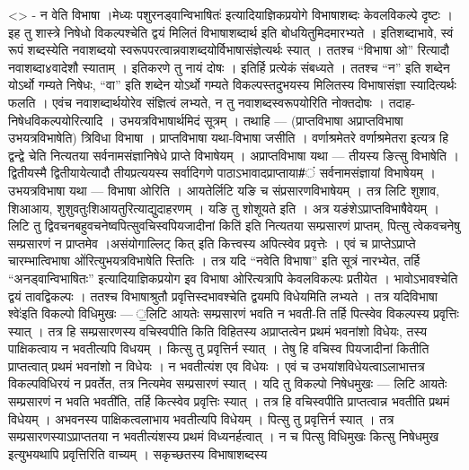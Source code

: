 \textless{}\textgreater{} - न वेति विभाषा ।मेध्यः पशुरनड्वान्विभाषितः॑
इत्यादियाज्ञिकप्रयोगे विभाषाशब्दः केवलविकल्पे दृष्टः । इह तु शास्त्रे
निषेधो विकल्पश्चेति द्वयं मिलितं विभाषाशब्दार्थ इति बोधयितुमिदमारभ्यते ।
इतिशब्दाभावे, स्वं रूपं शब्दस्येति नवाशब्दयो
स्वरूपपरत्वान्नवाशब्दयोर्विभाषासंज्ञेत्यर्थः स्यात् । ततश्च ``विभाषा ओ''
रित्यादौ नवाशब्दा४वादेशौ स्याताम् । इतिकरणे तु नायं दोषः । इतिर्हि
प्रत्येकं संबध्यते । ततश्च ``न'' इति शब्देन योऽर्थो गम्यते निषेधः,
``वा'' इति शब्देन योऽर्थो गम्यते विकल्पस्तदुभयस्य मिलितस्य विभाषासंज्ञा
स्यादित्यर्थः फलति । एवंच नवाशब्दार्थयोरेव संज्ञित्वं लभ्यते, न तु
नवाशब्दस्वरूपयोरिति नोक्तदोषः । तदाह-निषेधविकल्पयोरित्यादि ।
उभयत्रविभाषार्थमिदं सूत्रम् । तथाहि --- (प्राप्तविभाषा अप्राप्तविभाषा
उभयत्रविभाषेति) त्रिविधा विभाषा । प्राप्तविभाषा यथा-विभाषा जसीति ।
वर्णाश्रमेतरे वर्णाश्रमेतरा इत्यत्र हि द्वन्द्वे चेति नित्यतया
सर्वनामसंज्ञानिषेधे प्राप्ते विभाषेयम् । अप्राप्तविभाषा यथा --- तीयस्य
ङित्सु विभाषेति । द्वितीयस्मै द्वितीयायेत्यादौ तीयप्रत्ययस्य सर्वादिगणे
पाठाऽभावादप्राप्ताया\#ं सर्वनामसंज्ञायां विभाषेयम् । उभयत्रविभाषा यथा
--- विभाषा ओरिति । आयतेर्लिटि यङि च संप्रसारणविभाषेयम् । तत्र लिटि
शुशाव, शिआआय, शुशुवतुःशिआयतुरित्याद्युदाहरणम् । यङि तु शोशूयते इति ।
अत्र यङंशेऽप्राप्तविभाषैवेयम् । लिटि तु
द्विवचनबहुवचनेष्वपित्सुवचिस्वपियजादीनां किति॑ इति नित्यतया सम्प्रसारणं
प्राप्तम्, पित्सु त्वेकवचनेषु सम्प्रसारणं न प्राप्तमेव ।असंयोगाल्लिट्
कित् इति कित्त्वस्य अपित्स्वेव प्रवृत्तेः । एवं च प्राप्तेऽप्राप्ते
चारम्भात्विभाषा ओ॑रित्युभयत्रविभाषेति स्तितिः । तत्र यदि ``नवेति
विभाषा'' इति सूत्रं नारभ्येत, तर्हि ``अनड्वान्विभाषितः''
इत्यादियाज्ञिकप्रयोग इव विभाषा ओरित्यत्रापि केवलविकल्पः प्रतीयेत ।
भावोऽभावश्चेति द्वयं तावद्विकल्पः । ततश्च विभाषाश्रुतौ
प्रवृत्तिस्दभावश्चेति द्वयमपि विधेयमिति लभ्यते । तत्र यदिविभाषा
श्वेः॑इति विकल्पो विधिमुखः --- ॒लिटि आयतेः सम्प्रसारणं भवति न भवती-ति
तर्हि पित्स्वेव विकल्पस्य प्रवृत्तिः स्यात् । तत्र हि सम्प्रसारणस्य
वचिस्वपीति किति विहितस्य अप्राप्तत्वेन प्रथमं भवनांशो विधेयः, तस्य
पाक्षिकत्वाय न भवतीत्यपि विधयम् । कित्सु तु प्रवृत्तिर्न स्यात् । तेषु
हि वचिस्व पियजादीनां कितीति प्राप्तत्वात् प्रथमं भवनांशो न विधेयः । न
भवतीत्यंश एव विधेयः । एवं च उभयांशविधेयत्वाऽलाभात्तत्र विकल्पविधिरयं न
प्रवर्तेत, तत्र नित्यमेव सम्प्रसारणं स्यात् । यदि तु विकल्पो निषेधमुखः
--- लिटि आयतेः सम्प्रसारणं न भवति भवती॑ति, तर्हि कित्स्वेव प्रवृत्तिः
स्यात् । तत्र हि वचिस्वपीति प्राप्तत्वान्न भवतीति प्रथमं विधेयम् ।
अभवनस्य पाक्षिकत्वलाभाय भवतीत्यपि विधेयम् । पित्सु तु प्रवृत्तिर्न
स्यात् । तत्र सम्प्रसारणस्याऽप्राप्ततया न भवतीत्यंशस्य प्रथमं
विध्यनर्हत्वात् । न च पित्सु विधिमुखः कित्सु निषेधमुख इत्युभयथापि
प्रवृत्तिरिति वाच्यम् । सकृच्छतस्य विभाषाशब्दस्य

